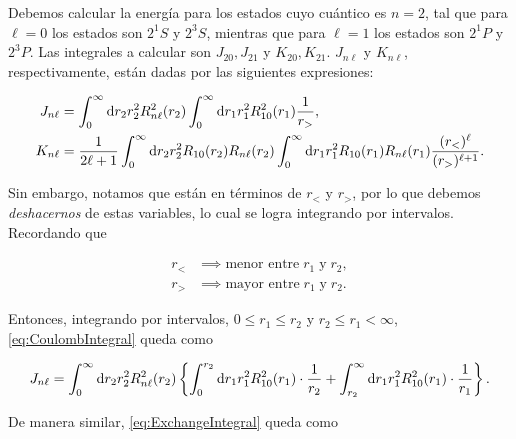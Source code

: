 \documentclass[./../main.tex]{subfiles}
\begin{document}
\begin{exercise}
        \begin{solution}
            Debemos calcular la energía para los estados cuyo cuántico es \(n = 2\), tal que para \(\ell = 0\) los estados son \(2^{1}S\) y \(2^{3}S\), mientras que para \(\ell = 1\) los estados son \(2^{1}P\) y \(2^{3}P\). Las integrales a calcular son \(J_{20},J_{21}\) y \(K_{20},K_{21}\). \(J_{n\ell}\) y \(K_{n\ell}\), respectivamente, están dadas por las siguientes expresiones:

            \begin{align}
                J_{n\ell} &= \int_{0}^{\infty}\odif{r_{2}}r_{2}^{2}R_{n\ell}^{2}(r_{2})\int_{0}^{\infty}\odif{r_{1}}r_{1}^{2}R_{10}^{2}(r_{1})\dfrac{1}{r_{>}},\label{eq:CoulombIntegral}\\
                K_{n\ell} &= \dfrac{1}{2\ell + 1}\int_{0}^{\infty}\odif{r_{2}}r_{2}^{2}R_{10}(r_{2})R_{n\ell}(r_{2})\int_{0}^{\infty}\odif{r_{1}}r_{1}^{2}R_{10}(r_{1})R_{n\ell}(r_{1})\dfrac{(r_{<})^{\ell}}{(r_{>})^{\ell + 1}}.\label{eq:ExchangeIntegral}
            \end{align}

            Sin embargo, notamos que están en términos de \(r_{<}\) y \(r_{>}\), por lo que debemos \emph{deshacernos} de estas variables, lo cual se logra integrando por intervalos. Recordando que

            \begin{align*}
                r_{<} &\implies \text{menor entre}\; r_{1}\;\text{y}\; r_{2},\\
                r_{>} &\implies \text{mayor entre}\; r_{1}\;\text{y}\; r_{2}.
            \end{align*}

            Entonces, integrando por intervalos, \(0 \leq r_{1} \leq r_{2}\) y \(r_{2} \leq r_{1} < \infty\), \cref{eq:CoulombIntegral} queda como

            \begin{equation}
                J_{n\ell} = \int_{0}^{\infty}\odif{r_{2}}r_{2}^{2}R_{n\ell}^{2}(r_{2})\left\lbrace\int_{0}^{r_{2}}\odif{r_{1}}r_{1}^{2}R_{10}^{2}(r_{1})\cdot\dfrac{1}{r_{2}} + \int_{r_{2}}^{\infty}\odif{r_{1}}r_{1}^{2}R_{10}^{2}(r_{1})\cdot\dfrac{1}{r_{1}}\right\rbrace.
                \label{eq:CoulombIntegralIntervals}
            \end{equation}

            De manera similar, \cref{eq:ExchangeIntegral} queda como


\end{solution}
\end{exercise}
\end{document}
